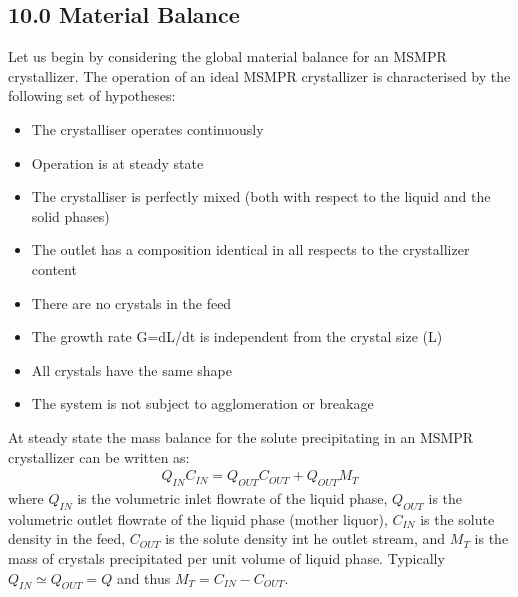 \documentclass[letterpaper,10pt,english]{jupyterBook}
\begin{document}
\subsection{10.0 Material Balance}
\label{\detokenize{MSMPR_crystallizer:material-balance}}
\sphinxAtStartPar
Let us begin by considering the global material balance for an MSMPR crystallizer. The operation of an ideal MSMPR crystallizer is characterised by the following set of hypotheses:
\begin{itemize}
\item {} 
\sphinxAtStartPar
The crystalliser operates continuously

\item {} 
\sphinxAtStartPar
Operation is at steady state

\item {} 
\sphinxAtStartPar
The crystalliser is perfectly mixed (both with respect to the liquid and the solid phases)

\item {} 
\sphinxAtStartPar
The outlet has a composition identical in all respects to the crystallizer content

\item {} 
\sphinxAtStartPar
There are no crystals in the feed

\item {} 
\sphinxAtStartPar
The growth rate G=dL/dt is independent from the crystal size (L)

\item {} 
\sphinxAtStartPar
All crystals have the same shape

\item {} 
\sphinxAtStartPar
The system is not subject to agglomeration or breakage

\end{itemize}

\sphinxAtStartPar
At steady state the mass balance for the solute precipitating in an MSMPR crystallizer can be written as:
\begin{equation}\label{equation:MSMPR_crystallizer:MSMPReq0}
\begin{split}
Q_{IN}C_{IN}=Q_{OUT}C_{OUT}+Q_{OUT}M_T
\end{split}
\end{equation}
\sphinxAtStartPar
where \(Q_{IN}\) is the volumetric inlet flowrate of the liquid phase, \(Q_{OUT}\) is the volumetric outlet flowrate of the liquid phase (mother liquor), \(C_{IN}\) is the solute density in the feed, \(C_{OUT}\) is the solute density int he outlet stream, and \(M_T\) is the mass of crystals precipitated per unit volume of liquid phase.
Typically \(Q_{IN}\simeq{Q_{OUT}}=Q\) and thus \(M_T=C_{IN}-C_{OUT}\).
\end{document}
